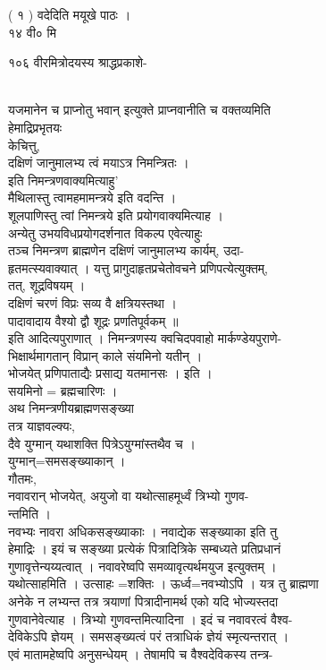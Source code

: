 \documentclass[11pt, openany]{book}
\begin{document}
{{{{{{{{{{{{{{{{{{{{%

{( १ ) वदेदिति मयूखे पाठः ।\\
१४ वी० मि‍

{१०६ वीरमित्रोदयस्य श्राद्धप्रकाशे-}{\\
यजमानेन च प्राप्नोतु भवान् इत्युक्ते प्राप्नवानीति च वक्तव्यमिति\\
हेमाद्रिप्रभृतयः \textbar{}\\
केचित्तु,\\
दक्षिणं जानुमालभ्य त्वं मयाऽत्र निमन्त्रितः ।\\
इति निमन्त्रणवाक्यमित्याहु' \textbar{}\\
मैथिलास्तु त्वामहमामन्त्रये इति वदन्ति ।\\
शूलपाणिस्तु त्वां निमन्त्रये इति प्रयोगवाक्यमित्याह ।\\
अन्येतु उभयविधप्रयोगदर्शनात विकल्प एवेत्याहुः \textbar{}\\
तञ्च निमन्त्रण ब्राह्मणेन दक्षिणं जानुमालभ्य कार्यम्, उदा-\\
हृतमत्स्यवाक्यात् । यत्तु प्रागुदाहृतप्रचेतोवचने प्रणिपत्येत्युक्तम्,\\
तत्, शूद्रविषयम् ।\\
दक्षिणं चरणं विप्रः सव्य वै क्षत्रियस्तथा ।\\
पादावादाय वैश्यो द्वौ शूद्रः प्रणतिपूर्वकम् ॥\\
इति आदित्यपुराणात् । निमन्त्रणस्य क्वचिदपवाहो मार्कण्डेयपुराणे-\\
भिक्षार्थमागतान् विप्रान् काले संयमिनो यतीन् ।\\
भोजयेत् प्रणिपाताद्यैः प्रसाद्य यतमानसः । इति ।\\
सयमिनो = ब्रह्मचारिणः ।\\
अथ निमन्त्रणीयब्राह्मणसङ्ख्या \textbar{}\\
तत्र याज्ञवल्क्यः,\\
दैवे युग्मान् यथाशक्ति पित्रेऽयुग्मांस्तथैव च ।\\
युग्मान्=समसङ्ख्याकान् ।\\
गौतमः,\\
नवावरान् भोजयेत्, अयुजो वा यथोत्साहमूर्ध्वं त्रिभ्यो गुणव-\\
न्तमिति ।\\
नवभ्यः नावरा अधिकसङ्ख्याकाः । नवाद्येक सङ्ख्याका इति तु\\
हेमाद्रिः । इयं च सङ्ख्या प्रत्येकं पित्रादित्रिके सम्बध्यते
प्रतिप्रधानं\\
गुणावृत्तेन्यय्यत्वात् । नवावरेष्वपि समव्यावृत्यर्थमयुज इत्युक्तम् ।\\
यथोत्साहमिति । उत्साहः =शक्तिः । ऊर्ध्व=नवभ्योऽपि । यत्र तु ब्राह्मणा\\
अनेके न लभ्यन्त तत्र त्रयाणां पित्रादीनामर्थ एको यदि भोज्यस्तदा\\
गुणवानेवेत्याह । त्रिभ्यो गुणवन्तमित्यादिना । इदं च नवावरत्वं वैश्व-\\
देविकेऽपि ज्ञेयम् । समसङ्ख्यत्वं परं तत्राधिकं ज्ञेयं स्मृत्यन्तरात् ।\\
एवं मातामहेष्वपि अनुसन्धेयम् । तेषामपि च वैश्वदेविकस्य तन्त्र-

}}}}}}}}}}}}}}}}}}}}}}
\end{document}
